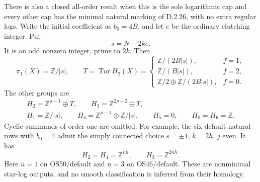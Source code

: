 There is also a closed all-order result when this is the
sole logarithmic cap and every other cap has the minimal
natural marking of D.2.26, with no extra regular logs.
Write the initial coefficient as $b_0=4B$, and let $e$
be the ordinary clutching integer. Put
\[
                         s=N-2ke .                       \tag{D.SL6}
\]
It is an odd nonzero integer, prime to $2k$. Then
\[
 \pi_1(X)=\mathbb Z/|s|,\qquad
 T=\operatorname{Tor}H_2(X)=
 \begin{cases}
 \mathbb Z/(2B|s|),&f=1,\\
 \mathbb Z/(B|s|),&f=2,\\
 \mathbb Z/2\oplus\mathbb Z/(2B|s|),&f=0.
 \end{cases}                                             \tag{D.SL7}
\]
The other groups are
\[
\begin{gathered}
 H_2=\mathbb Z^{\rho-1}\oplus T,\qquad
 H_3=\mathbb Z^{2\rho-2}\oplus T,\\
 H_1=\mathbb Z/|s|,\qquad
 H_4=\mathbb Z^{\rho-1}\oplus\mathbb Z/|s|,\qquad H_5=0,
 \qquad H_0=H_6=\mathbb Z .
\end{gathered}                                             \tag{D.SL8}
\]
Cyclic summands of order one are omitted. For example,
the six default natural rows with $b_0=4$ admit the
simply connected choice $s=\pm1$, $k=2h$, $j$ even.
It has
\[
          H_2=H_4=\mathbb Z^{nh},\qquad
                         H_3=\mathbb Z^{2nh}.              \tag{D.SL9}
\]
Here $n=1$ on OS50/default and $n=3$ on OS46/default.
These are nonminimal star-log outputs, and no smooth
classification is inferred from their homology.

